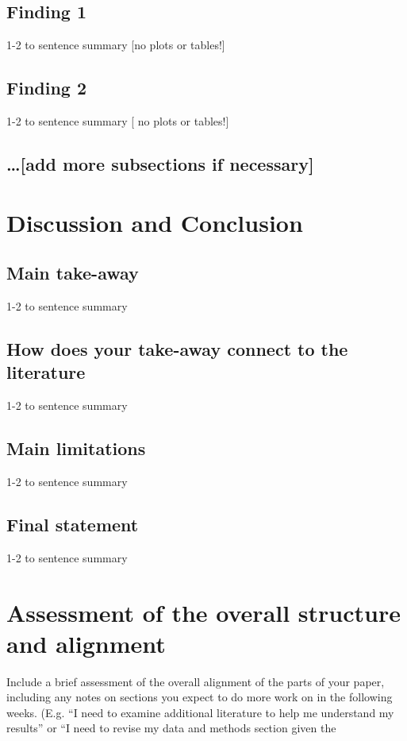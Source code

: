 \documentclass{article}
\begin{document}
\subsection*{Finding 1}
1-2 to sentence summary [no plots or tables!]

\subsection*{Finding 2}
1-2 to sentence summary [ no plots or tables!]

\subsection*{…[add more subsections if necessary]}


\section{Discussion and Conclusion}

\subsection*{Main take-away}
1-2 to sentence summary

\subsection*{How does your take-away connect to the literature}
1-2 to sentence summary

\subsection*{Main limitations}
1-2 to sentence summary

\subsection*{Final statement}
1-2 to sentence summary


\section*{Assessment of the overall structure and alignment}
Include a brief assessment of the overall alignment of the parts of your paper, including any notes on sections you expect to do more work on in the following weeks. (E.g. “I need to examine additional literature to help me understand my results” or “I need to revise my data and methods section given the
\end{document}
